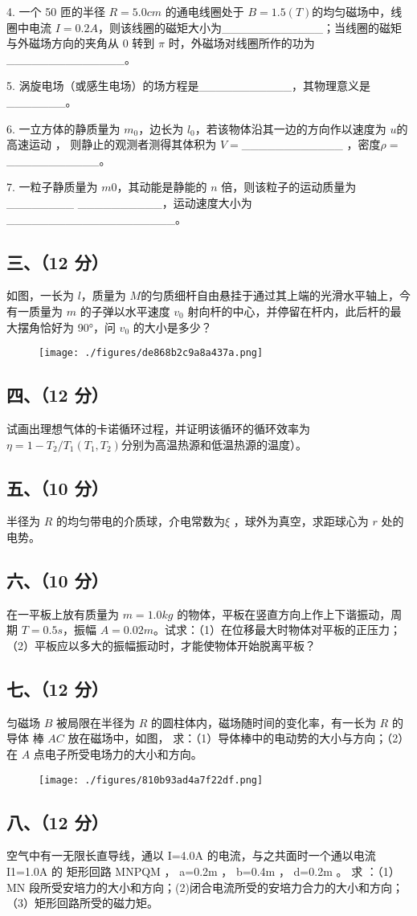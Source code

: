 4. 一个 50 匝的半径 $R=5.0cm$ 的通电线圈处于 $B=1.5(T)$的均匀磁场中，线圈中电流 $I=0.2A$，则该线圈的磁矩大小为____________；当线圈的磁矩与外磁场方向的夹角从 0 转到 $\pi$ 时，外磁场对线圈所作的功为______________。

5. 涡旋电场（或感生电场）的场方程是___________，其物理意义是_______。

6. 一立方体的静质量为 $m_0$，边长为 $l_0$，若该物体沿其一边的方向作以速度为 $u$的高速运动 ， 则静止的观测者测得其体积为 $V=$____________ ，密度$\rho=$___________。

7. 一粒子静质量为 $m0$，其动能是静能的 $n$ 倍，则该粒子的运动质量为________
__________，运动速度大小为____________________。
\subsection{三、（12 分）}
如图，一长为 $l$，质量为 $M $的匀质细杆自由悬挂于通过其上端的光滑水平轴上，今有一质量为 $m$ 的子弹以水平速度 $v_0$ 射向杆的中心，并停留在杆内，此后杆的最大摆角恰好为 90°，问 $v_0$ 的大小是多少？
\begin{figure}[ht]
\centering
\texttt{[image: ./figures/de868b2c9a8a437a.png]}
\caption{} \label{fig_NJUB07_2}
\end{figure}
\subsection{四、（12 分）}
试画出理想气体的卡诺循环过程，并证明该循环的循环效率为$\eta=1-T_2/T_1 (T_1,T_2) $分别为高温热源和低温热源的温度）。
\subsection{五、（10 分）}
半径为 $R$ 的均匀带电的介质球，介电常数为$\xi$ ，球外为真空，求距球心为 $r$ 处的电势。
\subsection{六、（10 分）}
在一平板上放有质量为 $m=1.0kg$ 的物体，平板在竖直方向上作上下谐振动，周期 $T=0.5s$，振幅 $A=0.02m$。试求：（1）在位移最大时物体对平板的正压力；（2）平板应以多大的振幅振动时，才能使物体开始脱离平板？
\subsection{七、（12 分）}
匀磁场 $B$ 被局限在半径为 $R$ 的圆柱体内，磁场随时间的变化率，有一长为 $R$ 的导体 棒 $AC$ 放在磁场中，如图， 求：（1）导体棒中的电动势的大小与方向；（2）在 $A$ 点电子所受电场力的大小和方向。
\begin{figure}[ht]
\centering
\texttt{[image: ./figures/810b93ad4a7f22df.png]}
\caption{} \label{fig_NJUB07_3}
\end{figure}
\subsection{八、（12 分）}
空气中有一无限长直导线，通以 I=4.0A 的电流，与之共面时一个通以电流 I1=1.0A 的 矩形回路 MNPQM ， a=0.2m ， b=0.4m ， d=0.2m 。 求 ：（1）MN 段所受安培力的大小和方向；(2)闭合电流所受的安培力合力的大小和方向；（3）矩形回路所受的磁力矩。